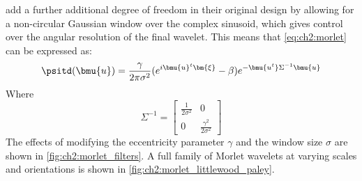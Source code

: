   \citeauthor{bruna_invariant_2013} \cite{bruna_invariant_2013} add a further
  additional degree of freedom in their original design by allowing for a
  non-circular Gaussian window over the complex sinusoid, which gives control
  over the angular resolution of the final wavelet. This means that \eqref{eq:ch2:morlet}
  can be expressed as:
  \begin{equation}
    \psitd(\bmu{u}) = \frac{\gamma}{2\pi\sigma^2}{(e^{i\bmu{u}^t\bm{\xi}} - \beta)}
                  e^{-\bmu{u^t}\Sigma^{-1}  \bmu{u}}
    \label{eq:ch2:morlet_slant}
  \end{equation}
  Where
  $$\Sigma^{-1} = \left[ \begin{smallmatrix}
      \frac{1}{2\sigma^2} & 0 \\
      0 & \frac{\gamma^2}{2\sigma^2}
      \end{smallmatrix} \right] $$
  The effects of modifying the eccentricity parameter $\gamma$ and the window size
  $\sigma$ are shown in \autoref{fig:ch2:morlet_filters}. A full family of
  Morlet wavelets at varying scales and orientations is shown in
  \autoref{fig:ch2:morlet_littlewood_paley}.


